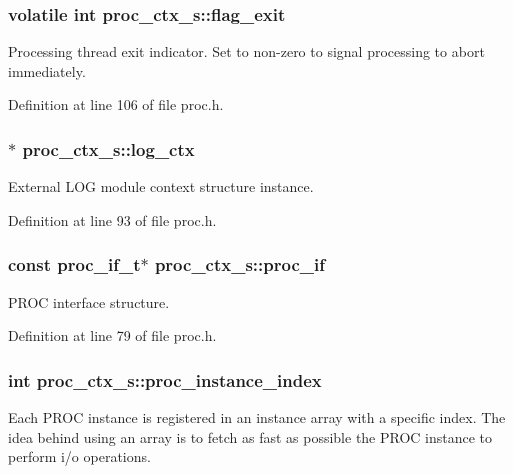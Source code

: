 \subsubsection[{\texorpdfstring{flag\+\_\+exit}{flag_exit}}]{\setlength{\rightskip}{0pt plus 5cm}volatile int proc\+\_\+ctx\+\_\+s\+::flag\+\_\+exit}\hypertarget{structproc__ctx__s_a86a21b28f6c41f7a9a4cc9586f782d68}{}\label{structproc__ctx__s_a86a21b28f6c41f7a9a4cc9586f782d68}
Processing thread exit indicator. Set to non-\/zero to signal processing to abort immediately. 

Definition at line 106 of file proc.\+h.

\subsubsection[{\texorpdfstring{log\+\_\+ctx}{log_ctx}}]{$\ast$ proc\+\_\+ctx\+\_\+s\+::log\+\_\+ctx}\hypertarget{structproc__ctx__s_a7c58dee78b4d7834e4c2fe430cd267d5}{}\label{structproc__ctx__s_a7c58dee78b4d7834e4c2fe430cd267d5}
External L\+OG module context structure instance. 

Definition at line 93 of file proc.\+h.

\subsubsection[{\texorpdfstring{proc\+\_\+if}{proc_if}}]{\setlength{\rightskip}{0pt plus 5cm}const {\bf proc\+\_\+if\+\_\+t}$\ast$ proc\+\_\+ctx\+\_\+s\+::proc\+\_\+if}\hypertarget{structproc__ctx__s_ae63f720fef21f807ed42fe76806140f6}{}\label{structproc__ctx__s_ae63f720fef21f807ed42fe76806140f6}
P\+R\+OC interface structure. 

Definition at line 79 of file proc.\+h.

\subsubsection[{\texorpdfstring{proc\+\_\+instance\+\_\+index}{proc_instance_index}}]{\setlength{\rightskip}{0pt plus 5cm}int proc\+\_\+ctx\+\_\+s\+::proc\+\_\+instance\+\_\+index}\hypertarget{structproc__ctx__s_a3912d4b5eaffcdaefa00f149ca4a8c63}{}\label{structproc__ctx__s_a3912d4b5eaffcdaefa00f149ca4a8c63}
Each P\+R\+OC instance is registered in an instance array with a specific index. The idea behind using an array is to fetch as fast as possible the P\+R\+OC instance to perform i/o operations. 

